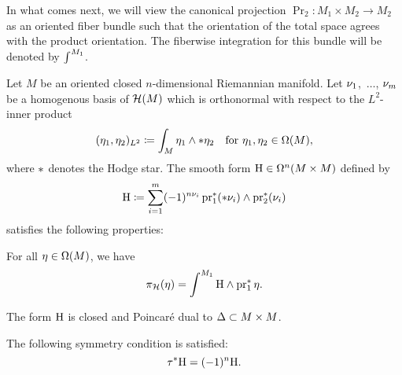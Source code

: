 \documentclass[\MainFolder/Text.tex]{subfiles}
\begin{document}
In what comes next, we will view the canonical projection $\Pr_2 : M_1 \times M_2 \rightarrow M_2$ as an oriented fiber bundle such that the orientation of the total space agrees with the product orientation. The fiberwise integration for this bundle will be denoted by $\int^{M_1}$. 

\begin{Proposition} \label{Lemma:HKer}
Let $M$ be an oriented closed $n$-dimensional Riemannian manifold. Let $\nu_1$,~$\dotsc$, $\nu_m$ be a homogenous basis of $\mathcal{H}(M)$ which is orthonormal with respect to the $L^2$-inner product 
$$ (\eta_1, \eta_2)_{L^2} \coloneqq \int_M \eta_1 \wedge *\eta_2\quad\text{for }\eta_1, \eta_2 \in \Omega(M), $$
where $*$ denotes the Hodge star. The smooth form $\mathrm{H} \in \Omega^n(M\times M)$ defined by
\begin{equation}\label{Eq:HKerHKerHKer}
\mathrm{H} \coloneqq \sum_{i=1}^m (-1)^{n \nu_i}\operatorname{\mathrm{pr}}_1^*(* \nu_i) \wedge \operatorname{\mathrm{pr}}_2^*(\nu_i)
\end{equation}
satisfies the following properties:
\begin{ClaimList}
\item For all $\eta\in \Omega(M)$, we have
\begin{equation*}
 \operatorname{\pi_{\mathcal{H}}}(\eta) = \int^{M_1} \mathrm{H}\wedge \operatorname{\mathrm{pr}}_1^*\eta.
\end{equation*} 
\item The form $\mathrm{H}$ is closed and Poincar\'e dual to $\Delta \subset M\times M$.
\item The following symmetry condition is satisfied:
\begin{equation} \label{Eq:SymHKer}
\tau^* \mathrm{H} = (-1)^n \mathrm{H}.
\end{equation}
\end{ClaimList}
\end{Proposition}
%
\end{document}
